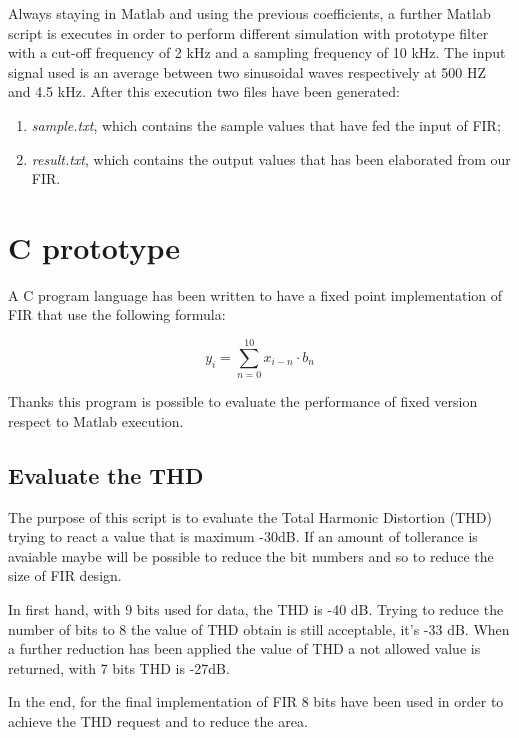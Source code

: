 Always staying in Matlab and using the previous coefficients, a further Matlab script is executes in order to perform
different simulation with prototype filter with a cut-off frequency of 2 kHz and a sampling frequency of 10 kHz. The input signal
used is an average between two sinusoidal waves respectively at 500 HZ and 4.5 kHz.
After this execution two files have been generated:

\begin{enumerate}
	\item \emph{sample.txt}, which contains the sample values that have fed the input of FIR;
	\item \emph{result.txt}, which contains the output values that has been elaborated from our FIR.
\end{enumerate}

\section{C prototype}

A C program language has been written to have a 
fixed point implementation of FIR that use the following formula:

\begin{displaymath}
y_i = \sum_{n=0}^{10}{x_{i-n} \cdot b_n}
\end{displaymath}

Thanks this program is possible to evaluate the performance of fixed version respect to 
Matlab execution.

\subsection{Evaluate the THD}

The purpose of this script is to evaluate the Total Harmonic Distortion (THD) trying to react a value that is
maximum -30dB. If an amount of tollerance is avaiable maybe will be possible to reduce 
the bit numbers and so to reduce the size of FIR design.


In first hand, with 9 bits used for data, the THD is -40 dB. Trying to reduce the number of bits to 8 the value of THD obtain 
is still acceptable, it's -33 dB. When a further reduction has been applied the value of THD a 
not allowed value is returned, with 7 bits THD is -27dB.

In the end, for the final implementation of FIR 8 bits have been used in order to achieve the THD request and 
to reduce the area.

